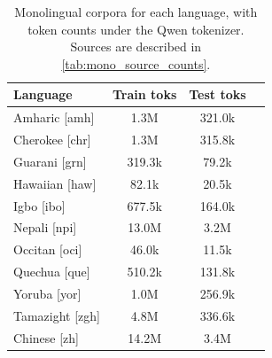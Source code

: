 \begin{table}[h!]
    \small
    \centering
        \begin{tabular}{l c c c}
            \toprule
            \textbf{Language} & \textbf{Train toks} & \textbf{Test toks} \\
            \midrule
            Amharic [amh] & 1.3M & 321.0k \\ 
            Cherokee [chr] & 1.3M & 315.8k \\ 
            Guarani [grn] & 319.3k & 79.2k \\ 
            Hawaiian [haw] & 82.1k & 20.5k \\ 
            Igbo [ibo] & 677.5k & 164.0k \\ 
            Nepali [npi] & 13.0M & 3.2M \\ 
            Occitan [oci] & 46.0k & 11.5k \\ 
            Quechua [que] & 510.2k & 131.8k \\ 
            Yoruba [yor] & 1.0M & 256.9k \\ 
            Tamazight [zgh] & 4.8M & 336.6k \\ 
            Chinese [zh] & 14.2M & 3.4M \\ 
            \bottomrule
        \end{tabular}
    \caption{Monolingual corpora for each language, with token counts under the Qwen tokenizer. Sources are described in \autoref{tab:mono_source_counts}.}
    \label{tab:monolingual}
\end{table}